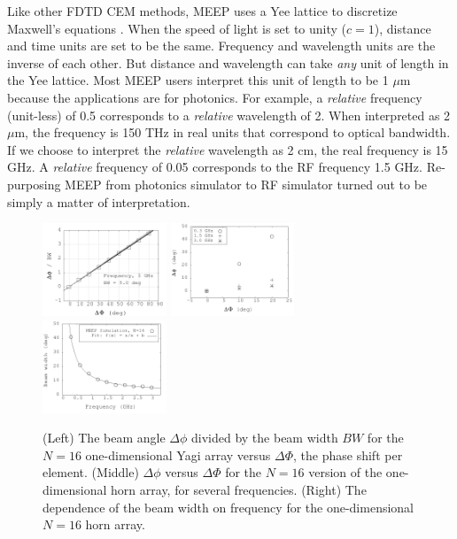 \documentclass[../../main.tex]{subfiles}
\begin{document}
Like other FDTD CEM methods, MEEP uses a Yee lattice to discretize Maxwell's equations \cite{10.1109/tap.1966.1138693}.  When the speed of light is set to unity ($c = 1$), distance and time units are set to be the same.  Frequency and wavelength units are the inverse of each other.  But distance and wavelength can take \textit{any} unit of length in the Yee lattice.  Most MEEP users interpret this unit of length to be 1 $\mu$m because the applications are for photonics.  For example, a \textit{relative} frequency (unit-less) of 0.5 corresponds to a \textit{relative} wavelength of 2.  When interpreted as 2 $\mu$m, the frequency is 150 THz in real units that correspond to optical bandwidth.  If we choose to interpret the \textit{relative} wavelength as 2 cm, the real frequency is 15 GHz.  A \textit{relative} frequency of 0.05 corresponds to the RF frequency 1.5 GHz.  Re-purposing MEEP from photonics simulator to RF simulator turned out to be simply a matter of interpretation. \\ \vspace{2.5mm}

\begin{figure}
\centering
\includegraphics[width=0.33\textwidth]{figures/Oct30_plot1.png}
\includegraphics[width=0.33\textwidth]{figures/Aug11_plot2.png}
\includegraphics[width=0.33\textwidth]{figures/Aug11_plot1.png}
\caption{\label{fig:pa_1} (Left) The beam angle $\Delta \phi$ divided by the beam width $BW$ for the $N = 16$ one-dimensional Yagi array versus $\Delta \Phi$, the phase shift per element. (Middle) $\Delta \phi$ versus $\Delta \Phi$ for the $N=16$ version of the one-dimensional horn array, for several frequencies.  (Right) The dependence of the beam width on frequency for the one-dimensional $N=16$ horn array.}
\end{figure}
\end{document}
